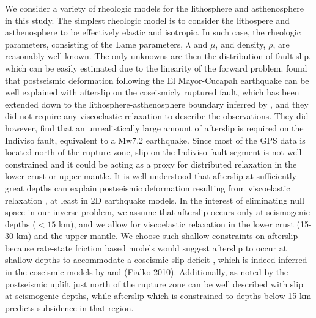 \documentclass[1p]{elsarticle}
\begin{document}
We consider a variety of rheologic models for the lithosphere and asthenosphere in this study.  The simplest rheologic model is to consider the lithospere and asthenosphere to be effectively elastic and isotropic.  In such case, the rheologic parameters, consisting of the Lame parameters, $\lambda$ and $\mu$, and density, $\rho$, are reasonably well known. The only unknowns are then the distribution of fault slip, which can be easily estimated due to the linearity of the forward problem.  \cite{Rollins2015} found that postseismic deformation following the El Mayor-Cucapah earthquake can be well explained with afterslip on the coseismicly ruptured fault, which has been extended down to the lithosphere-asthenosphere boundary inferred by \cite{Lekic2011}, and they did not require any viscoelastic relaxation to describe the observations.  They did however, find that an unrealistically large amount of afterslip is required on the Indiviso fault, equivalent to a Mw7.2 earthquake.  Since most of the GPS data is located north of the rupture zone, slip on the Indiviso fault segment is not well constrained and it could be acting as a proxy for distributed relaxation in the lower crust or upper mantle.  It is well understood that afterslip at sufficiently great depths can explain postseismic deformation resulting from viscoelastic relaxation \cite{Savage1990}, at least in 2D earthquake models.  In the interest of eliminating null space in our inverse problem,  we assume that afterslip occurs only at seismogenic depths ($<15$ km), and we allow for viscoelastic relaxation in the lower crust (15-30 km) and the upper mantle.  We choose such shallow constraints on afterslip because rate-state friction based models would suggest afterslip to occur at shallow depths to accommodate a coseismic slip deficit \cite{Marone1991}, which is indeed inferred in the coseismic models by \cite{Wei2011a} and (Fialko 2010).  Additionally, as noted by \cite{Rollins2015} the postseismic uplift just north of the rupture zone can be well described with slip at seismogenic depths, while afterslip which is constrained to depths below 15 km predicts subsidence in that region.  
\end{document}
